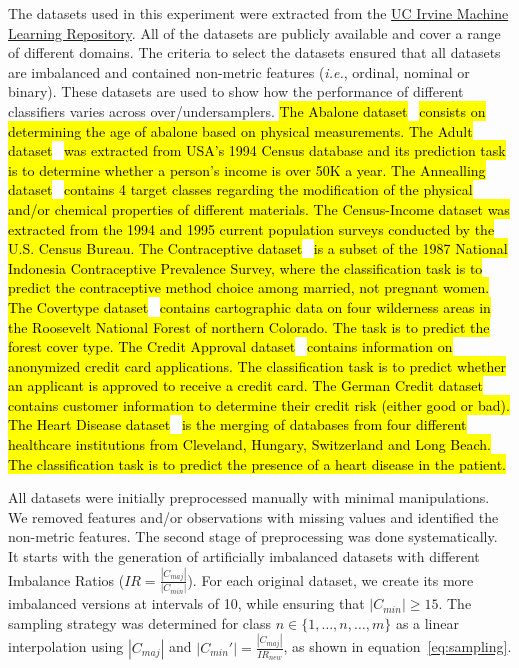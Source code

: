 \documentclass[preprint,12pt]{elsarticle}
\begin{document}
{The datasets used in this experiment were extracted from the
\href{https://archive.ics.uci.edu}{UC Irvine Machine Learning Repository}. All
of the datasets are publicly available and cover a range of different domains.
The criteria to select the datasets ensured that all datasets are imbalanced
and contained non-metric features (\textit{i.e.}, ordinal, nominal or binary).
These datasets are used to show how the performance of different classifiers
varies across over/undersamplers.\hl{ The Abalone
dataset}~\cite{clark1996quantitative}\hl{ consists on determining the age of
abalone based on physical measurements. The Adult
dataset}~\cite{kohavi1996scaling}\hl{ was extracted from USA's 1994 Census
database and its prediction task is to determine whether a person's income is
over 50K a year. The Annealling dataset}~\cite{quinlan1987decision}\hl{
contains 4 target classes regarding the modification of the physical and/or
chemical properties of different materials. The Census-Income dataset was
extracted from the 1994 and 1995 current population surveys conducted by the
U.S. Census Bureau. The Contraceptive dataset}~\cite{lim2000comparison}\hl{ is
a subset of the 1987 National Indonesia Contraceptive Prevalence Survey, where
the classification task is to predict the contraceptive method choice among
married, not pregnant women. The Covertype
dataset}~\cite{blackard1999comparative}\hl{ contains cartographic data on
four wilderness areas in the Roosevelt National Forest of northern
Colorado. The task is to predict the forest cover type. The Credit Approval
dataset}~\cite{quinlan1987simplifying}\hl{ contains information on anonymized
credit card applications. The classification task is to predict whether an
applicant is approved to receive a credit card. The German Credit dataset
contains customer information to determine their credit risk (either
good or bad). The Heart Disease dataset}~\cite{detrano1989international}\hl{
is the merging of databases from four different healthcare institutions from
Cleveland, Hungary, Switzerland and Long Beach. The classification task is to
predict the presence of a heart disease in the patient.}

All datasets were initially preprocessed manually with minimal manipulations.
We removed features and/or observations with missing values and identified the
non-metric features. The second stage of preprocessing was done
systematically. It starts with the generation of artificially imbalanced
datasets with different Imbalance Ratios ($IR=\frac{|C_{maj}|}{|C_{min}|}$).
For each original dataset, we create its more imbalanced versions at intervals
of 10, while ensuring that $|C_{min}| \ge 15$. The sampling strategy was
determined for class $n \in \{1,\ldots,n,\ldots,m\}$ as a linear interpolation
using $|C_{maj}|$ and $|C_{min}'|=\frac{|C_{maj}|}{IR_{new}}$, as shown in
equation~\ref{eq:sampling}.

}
\end{document}
